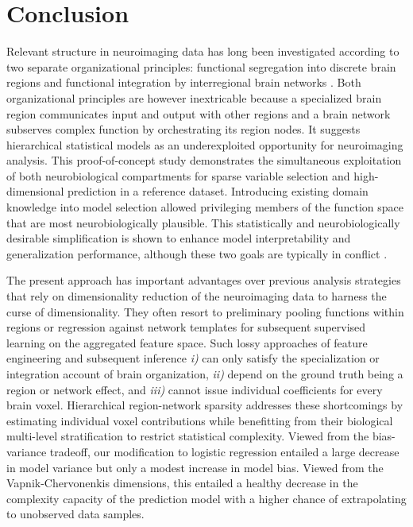 \documentclass{article}
\begin{document}
\section{Conclusion}
Relevant structure in neuroimaging data has long been investigated
according to two separate organizational principles:
functional segregation into discrete brain regions
\cite{passingham2002}
and functional integration by interregional brain networks
\cite{sporns14nn}.
Both organizational principles are however inextricable because
a specialized brain region communicates input and output with other regions
and a brain network subserves complex function by
orchestrating its region nodes.
It suggests hierarchical statistical models
as an underexploited opportunity for neuroimaging analysis.
%
This proof-of-concept study demonstrates the simultaneous exploitation of
both neurobiological compartments
for sparse variable selection and high-dimensional prediction
in a reference dataset.
%
Introducing existing domain knowledge into model selection
allowed privileging members of the function space
that are most neurobiologically plausible.
%
This statistically and neurobiologically desirable simplification
is shown to enhance
model interpretability and generalization performance,
although these two goals are typically in conflict
\cite{hastie2015statistical}.



The present approach has important advantages over previous
analysis strategies that rely on dimensionality reduction of
the neuroimaging data to harness the curse of dimensionality.
They often resort to preliminary pooling functions within regions
or regression against network templates
for subsequent supervised learning on the aggregated feature space.
Such lossy approaches of
feature engineering and subsequent inference
\textit{i)} can only satisfy the specialization or
integration account of brain organization,
\textit{ii)} depend on the ground truth being a region or network effect,
and
\textit{iii)} cannot issue individual coefficients for every brain voxel.
%
Hierarchical region-network sparsity addresses these shortcomings
by estimating individual voxel contributions
while benefitting from their biological multi-level stratification
to restrict statistical complexity.
%
Viewed from the bias-variance tradeoff,
our modification to logistic regression
entailed a large decrease in model variance but only a modest
increase in model bias.
Viewed from the Vapnik-Chervonenkis dimensions,
this entailed a healthy decrease in the complexity capacity of the prediction model
with a higher chance of extrapolating to unobserved data samples.
\end{document}
